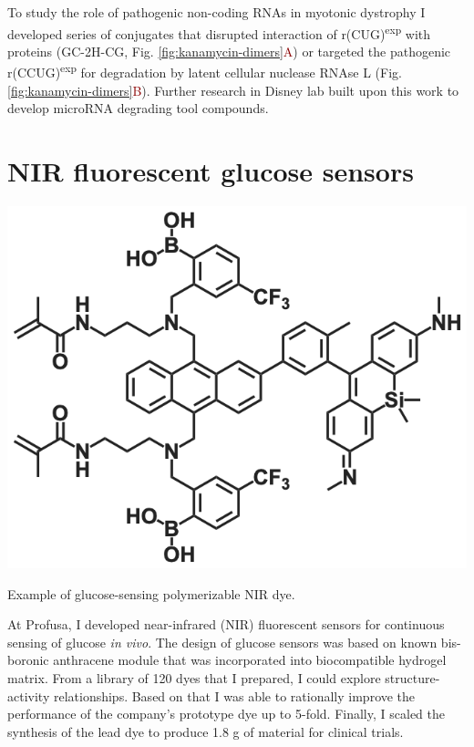 \documentclass{tufte-handout}
\begin{document}
 To study the role of pathogenic non-coding RNAs in myotonic dystrophy I developed series of conjugates that disrupted interaction of r(CUG)\textsuperscript{exp} with proteins (GC-2H-CG, Fig. \ref{fig:kanamycin-dimers}\textcolor{DarkRed}{A}) or targeted the pathogenic r(CCUG)\textsuperscript{exp} for degradation by latent cellular nuclease RNAse L (Fig. \ref{fig:kanamycin-dimers}\textcolor{DarkRed}{B}). Further research in Disney lab built upon this work to develop microRNA degrading tool compounds.



\section{NIR fluorescent glucose sensors}

\begin{marginfigure}\label{fig:profusa}
	\includegraphics{v1dye.png}
	\caption{Example of glucose-sensing polymerizable NIR dye.}
\end{marginfigure}

At Profusa, I developed near-infrared (NIR) fluorescent sensors for continuous sensing of glucose \textit{in vivo}. The design of glucose sensors was based on known bis-boronic anthracene module that was incorporated into biocompatible hydrogel matrix. From a library of 120 dyes that I prepared\cite{Gamsey2018}, I could explore structure-activity relationships. Based on that I was able to rationally improve the performance of the company's prototype dye up to 5-fold. Finally, I scaled the synthesis of the lead dye to produce 1.8 g of material for clinical trials.
\end{document}
